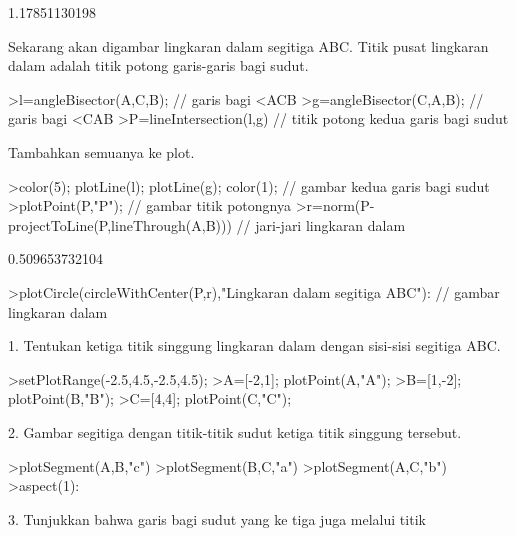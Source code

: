 \documentclass[a4paper,10pt]{article}
\begin{document}
\begin{eulernotebook}
\begin{eulercomment}
\begin{eulercomment}
\begin{euleroutput}
  [1.16667,  1.16667]
  1.17851130198
\end{euleroutput}
\begin{eulercomment}
Sekarang akan digambar lingkaran dalam segitiga ABC. Titik pusat lingkaran dalam adalah
titik potong garis-garis bagi sudut.
\end{eulercomment}
\begin{eulerprompt}
>l=angleBisector(A,C,B); // garis bagi <ACB
>g=angleBisector(C,A,B); // garis bagi <CAB
>P=lineIntersection(l,g) // titik potong kedua garis bagi sudut
\end{eulerprompt}
\begin{euleroutput}
  [0.86038,  0.86038]
\end{euleroutput}
\begin{eulercomment}
Tambahkan semuanya ke plot.
\end{eulercomment}
\begin{eulerprompt}
>color(5); plotLine(l); plotLine(g); color(1); // gambar kedua garis bagi sudut
>plotPoint(P,"P"); // gambar titik potongnya
>r=norm(P-projectToLine(P,lineThrough(A,B))) // jari-jari lingkaran dalam
\end{eulerprompt}
\begin{euleroutput}
  0.509653732104
\end{euleroutput}
\begin{eulerprompt}
>plotCircle(circleWithCenter(P,r),"Lingkaran dalam segitiga ABC"): // gambar lingkaran dalam
\end{eulerprompt}
\begin{eulercomment}
1. Tentukan ketiga titik singgung lingkaran dalam dengan sisi-sisi
segitiga ABC.
\end{eulercomment}
\begin{eulerprompt}
>setPlotRange(-2.5,4.5,-2.5,4.5);
>A=[-2,1]; plotPoint(A,"A");
>B=[1,-2]; plotPoint(B,"B");
>C=[4,4]; plotPoint(C,"C");
\end{eulerprompt}
\begin{eulercomment}
2. Gambar segitiga dengan titik-titik sudut ketiga titik singgung
tersebut.
\end{eulercomment}
\begin{eulerprompt}
>plotSegment(A,B,"c")
>plotSegment(B,C,"a")
>plotSegment(A,C,"b")
>aspect(1):
\end{eulerprompt}
\begin{eulercomment}
3. Tunjukkan bahwa garis bagi sudut yang ke tiga juga melalui titik

\end{eulercomment}
\end{eulercomment}
\end{eulercomment}
\end{eulernotebook}
\end{document}
